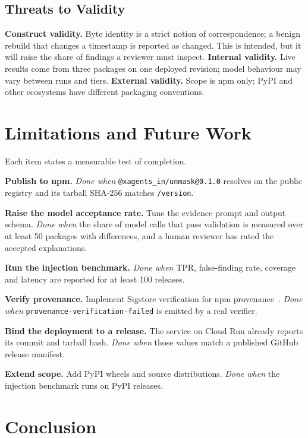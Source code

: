 \documentclass[conference]{IEEEtran}
\newcommand{\code}[1]{\texttt{#1}}
\begin{document}
\subsection{Threats to Validity}
\textbf{Construct validity.} Byte identity is a strict notion of
correspondence; a benign rebuild that changes a timestamp is reported as
\textsf{changed}. This is intended, but it will raise the share of findings a
reviewer must inspect. \textbf{Internal validity.} Live results come from three
packages on one deployed revision; model behaviour may vary between runs and
tiers. \textbf{External validity.} Scope is npm
only; PyPI and other ecosystems have different packaging conventions.

\section{Limitations and Future Work}\label{sec:future}

Each item states a measurable test of completion.

\textbf{Publish to npm.} \emph{Done when} \code{@xagents\_in/unmask@0.1.0}
resolves on the public registry and its tarball SHA-256 matches \code{/version}.

\textbf{Raise the model acceptance rate.} Tune the evidence prompt and output
schema. \emph{Done when} the share of model calls that pass validation is
measured over at least 50 packages with differences, and a human reviewer has
rated the accepted explanations.

\textbf{Run the injection benchmark.} \emph{Done when} TPR, false-finding rate,
coverage and latency are reported for at least 100 releases.

\textbf{Verify provenance.} Implement Sigstore verification for npm
provenance~\cite{sigstore,npmprov}. \emph{Done when}
\code{provenance-verification-failed} is emitted by a real verifier.

\textbf{Bind the deployment to a release.} The service on Cloud Run already
reports its commit and tarball hash. \emph{Done when} those values match a
published GitHub release manifest.

\textbf{Extend scope.} Add PyPI wheels and source distributions. \emph{Done when}
the injection benchmark runs on PyPI releases.

\section{Conclusion}
\end{document}
